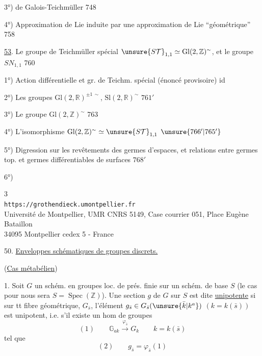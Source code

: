 3°)  de Galois-Teichmüller \hfill 748

4°) Approximation de Lie induite par une approximation de Lie ``géométrique'' \hfill 758

\uline{53}. Le groupe de Teichmüller spécial $\unsure{S\mathcal T}_{1,1}\simeq\mathrm{Gl}(2,\mathbb Z)^{\sim}$, et le groupe $SN_{1,1}$ \hfill 760

1°) Action différentielle et gr. de Teichm. spécial (énoncé provisoire) \hfill id

2°) Les groupes $\mathrm{Gl}(2,\mathbb R)^{\pm1\,\sim}$, $\mathrm{Sl}(2,\mathbb R)^{\sim}$ \hfill $761'$

3°) Le groupe $\mathrm{Gl}(2,\mathbb Z)^{\sim}$ \hfill 763

4°) L'isomorphisme $\mathrm{Gl}(2,\mathbb Z)^{\sim}\simeq\unsure{S\mathcal T}_{1,1}$ \hfill $\unsure{766'|765'}$

5°) Digression sur les revêtements des germes d'espaces, et relations entre germes top. et germes différentiables de surfaces \hfill $768'$

6°)



\begin{center}
\small
3\\
\texttt{https://grothendieck.umontpellier.fr}\\
Université de Montpellier, UMR CNRS 5149, Case courrier 051, Place Eugène Bataillon\\
34095 Montpellier cedex 5 - France
\end{center}

50. \uline{Enveloppes schématiques de groupes discrets.}

(\uline{Cas métabélien})

1. Soit $G$ un schém. en groupes loc. de prés. finie
sur un schém. de base $S$ (le cas  pour nous sera
$S=\operatorname{Spec}(\mathbb Z)$). Une section $g$ de $G$ sur $S$ est dite
\uline{unipotente} si sur tt fibre géométrique,
 $G_{\bar s}$, l'élément
$g_{\bar s}\in G_{\bar s}(\unsure{\bar k|k^a})$
$(k=k(\bar s))$ est unipotent, i.e. s'il existe un hom de groupes
\[
(1)\qquad \mathbb G_{ak}\xrightarrow{\varphi_{\bar s}}G_k
\qquad k=k(\bar s)
\]
tel que
\[
(2)\qquad g_{\bar s}=\varphi_{\bar s}(1)
\]


